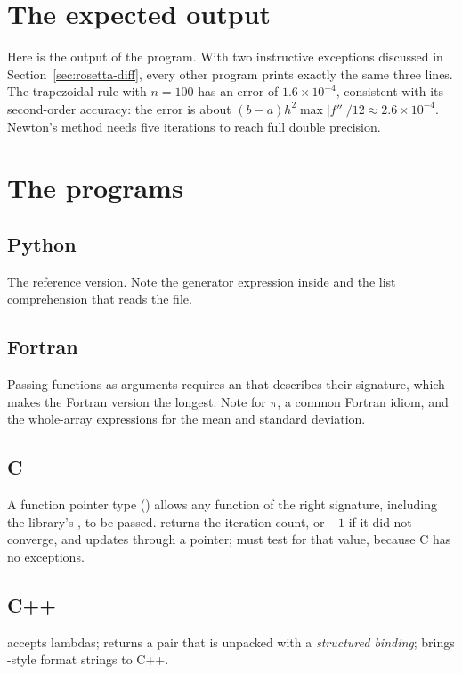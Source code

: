 \section{The expected output}

Here is the output of the \py program. With two instructive exceptions discussed in
Section~\ref{sec:rosetta-diff}, every other program prints exactly the same three lines.
The trapezoidal rule with $n = 100$ has an error of $1.6\times10^{-4}$, consistent with its
second-order accuracy: the error is about $(b-a)h^2 \max|f''|/12 \approx 2.6\times10^{-4}$.
Newton's method needs five iterations to reach full double precision.

\section{The programs}

\subsection*{Python}
The reference version. Note the generator expression inside  and the
list comprehension that reads the file.

\subsection*{Fortran}
Passing functions as arguments requires an  that describes their
signature, which makes the Fortran version the longest. Note  for
$\pi$, a common Fortran idiom, and the whole-array expressions for the mean and standard
deviation.

\subsection*{C}
A function pointer type () allows any function of
the right signature, including the library's , to be passed. 
returns the iteration count, or $-1$ if it did not converge, and updates  through a
pointer;  must test for that value, because C has no exceptions.

\subsection*{C++}
 accepts lambdas;  returns a pair that is unpacked with a
\emph{structured binding};  brings \py-style format strings to C++.

